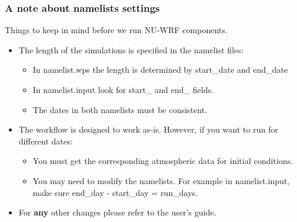 \begin{frame}[fragile]\frametitle{A note about namelists settings}

Things to keep in mind before we run NU-WRF components.
\mbox{}\\
\begin{itemize}
\item The length of the simulations is specified in the namelist files:
\begin{itemize}
\item In namelist.wps the length is determined by start\_date and end\_date
\item In namelist.input look for start\_ and end\_ fields. 
\item The dates in both namelists must be consistent.
\end{itemize}
\item The workflow is designed to work as-is. However, if you want to run for different dates:
\begin{itemize}
\item You must get the corresponding atmospheric data for initial conditions. 
\item You may need to modify the namelists. For example in namelist.input, make sure end\_day - start\_day = run\_days.
\end{itemize}
\item For \textbf{any} other changes please refer to the user's guide.
\end{itemize}
\end{frame}

